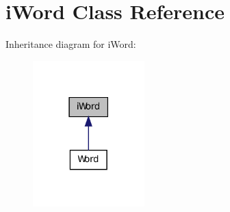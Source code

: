 \hypertarget{classiWord}{
\section{iWord Class Reference}
\label{classiWord}
}


Inheritance diagram for iWord:
\nopagebreak
\begin{figure}[H]
\begin{center}
\leavevmode
\includegraphics[width=122pt]{classiWord__inherit__graph}
\end{center}
\end{figure}
